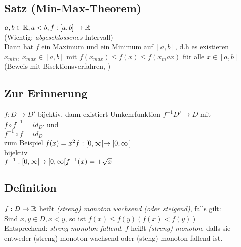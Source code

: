 \subsection{Satz (Min-Max-Theorem)}
$a,b \in \mathbb{R} , a < b, f : [a,b] \to \mathbb{R}$\\
(Wichtig: \emph{abgeschlossenes} Intervall)\\
Dann hat $f$ ein Maximum und ein Minimum auf $[a,b]$, d.h es existieren\\ $x_{min},\ x_{max} \in [a,b]$ mit $f(x_{max}) \leq f(x) \leq f(x_max)$ für alle $x \in [a,b]$ (Beweis mit Bisektionsverfahren, \cite{k4})
\subsection*{Zur Erinnerung}
$f: D \to D'$ bijektiv, dann existiert Umkehrfunktion $f^{-1} D' \to D$ mit \\
$f \circ f^{-1} = id_{D'}$ und \\
$f^{-1} \circ f = id_D$\\
zum Beispiel $f(x) = x^2\\
f :[0,\infty[ \to [0,\infty[$\\
bijektiv\\
$f^{-1} :[0,\infty[ \to [0,\infty[\\
f^{-1}(x) = +\sqrt{x}$
\subsection{Definition}
$f: D \to \mathbb{R}$ hei\ss t {\em(streng) monoton wachsend (oder steigend)}, falls gilt:\\
 Sind $x,y \in D, x < y$, so ist $f(x) \leq f(y) (f(x) < f(y))$\\
Entsprechend: {\em streng monoton fallend}. $f$ hei\ss t {\em (streng) monoton}, dalls sie entweder (streng) monoton wachsend oder (steng) monoton fallend ist.
